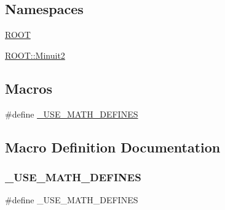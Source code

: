 \subsection*{Namespaces}
\begin{DoxyCompactItemize}
\item 
 \mbox{\hyperlink{namespaceROOT}{R\+O\+OT}}
\item 
 \mbox{\hyperlink{namespaceROOT_1_1Minuit2}{R\+O\+O\+T\+::\+Minuit2}}
\end{DoxyCompactItemize}
\subsection*{Macros}
\begin{DoxyCompactItemize}
\item 
\#define \mbox{\hyperlink{adat-devel_2other__libs_2minuit_2test_2MnSim_2GaussFunction_8h_a525335710b53cb064ca56b936120431e}{\+\_\+\+U\+S\+E\+\_\+\+M\+A\+T\+H\+\_\+\+D\+E\+F\+I\+N\+ES}}
\end{DoxyCompactItemize}


\subsection{Macro Definition Documentation}
\mbox{\label{adat-devel_2other__libs_2minuit_2test_2MnSim_2GaussFunction_8h_a525335710b53cb064ca56b936120431e}} 
\subsubsection{\texorpdfstring{\_USE\_MATH\_DEFINES}{\_USE\_MATH\_DEFINES}}
{\footnotesize\ttfamily \#define \+\_\+\+U\+S\+E\+\_\+\+M\+A\+T\+H\+\_\+\+D\+E\+F\+I\+N\+ES}

